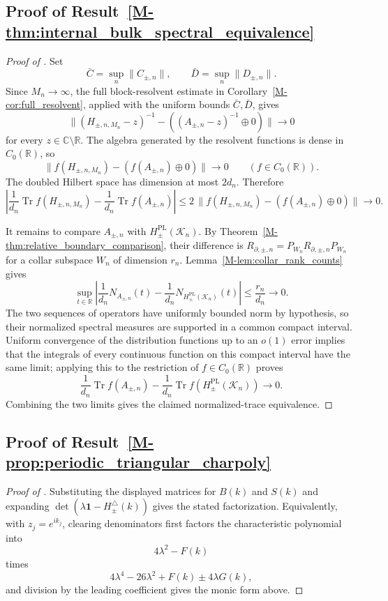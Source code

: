 \documentclass[11pt]{article}
\numberwithin{equation}{section}
\theoremstyle{definition}
\theoremstyle{remark}
\newcommand{\K}{\mathcal{K}}
\newcommand{\Id}{\mathbf{1}}
\begin{document}
\subsection{Proof of Result~\ref{M-thm:internal_bulk_spectral_equivalence}}\label{app:proof:thm:internal_bulk_spectral_equivalence}
\begin{proof}[Proof of ]
Set
\[
\bar C=\sup_n\|C_{\pm,n}\|,\qquad \bar D=\sup_n\|D_{\pm,n}\|.
\]
Since \(M_n\to\infty\), the full block-resolvent estimate in
Corollary~\ref{M-cor:full_resolvent}, applied with the uniform bounds \(\bar C,\bar D\), gives
\[
\|(H_{\pm,n,M_n}-z)^{-1}-((A_{\pm,n}-z)^{-1}\oplus0)\|\longrightarrow0
\]
for every \(z\in\mathbb C\setminus\mathbb R\). The algebra generated by the resolvent functions is
dense in \(C_0(\mathbb R)\), so
\[
\|f(H_{\pm,n,M_n})-(f(A_{\pm,n})\oplus0)\|\longrightarrow0
\qquad(f\in C_0(\mathbb R)).
\]
The doubled Hilbert space has dimension at most \(2d_n\). Therefore
\[
\left|
\frac1{d_n}\operatorname{Tr} f(H_{\pm,n,M_n})
-
\frac1{d_n}\operatorname{Tr} f(A_{\pm,n})
\right|
\le
2\,\|f(H_{\pm,n,M_n})-(f(A_{\pm,n})\oplus0)\|
\longrightarrow0 .
\]

It remains to compare \(A_{\pm,n}\) with \(H^{\mathrm{PL}}_{\pm}(\K_n)\). By
Theorem~\ref{M-thm:relative_boundary_comparison}, their difference is
\(R_{\partial,\pm,n}=P_{W_n}R_{\partial,\pm,n}P_{W_n}\) for a collar subspace \(W_n\) of
dimension \(r_n\). Lemma~\ref{M-lem:collar_rank_counts} gives
\[
\sup_{t\in\mathbb R}
\left|
\frac1{d_n}N_{A_{\pm,n}}(t)
-
\frac1{d_n}N_{H^{\mathrm{PL}}_{\pm}(\K_n)}(t)
\right|
\le
\frac{r_n}{d_n}\longrightarrow0 .
\]
The two sequences of operators have uniformly bounded norm by hypothesis, so their normalized
spectral measures are supported in a common compact interval. Uniform convergence of the
distribution functions up to an \(o(1)\) error implies that the integrals of every continuous
function on this compact interval have the same limit; applying this to the restriction of
\(f\in C_0(\mathbb R)\) proves
\[
\frac1{d_n}\operatorname{Tr} f(A_{\pm,n})
-
\frac1{d_n}\operatorname{Tr} f(H^{\mathrm{PL}}_{\pm}(\K_n))
\longrightarrow0 .
\]
Combining the two limits gives the claimed normalized-trace equivalence.
\end{proof}

\subsection{Proof of Result~\ref{M-prop:periodic_triangular_charpoly}}\label{app:proof:prop:periodic_triangular_charpoly}
\begin{proof}[Proof of ]
Substituting the displayed matrices for \(B(k)\) and \(S(k)\) and expanding
\(\det(\lambda\Id-H_\pm^\triangle(k))\) gives the stated factorization. Equivalently, with
\(z_j=e^{ik_j}\), clearing denominators first factors the characteristic polynomial into
\[
4\lambda^2-F(k)
\]
times
\[
4\lambda^4-26\lambda^2+F(k)\pm4\lambda G(k),
\]
and division by the leading coefficient gives the monic form above.
\end{proof}
\end{document}
